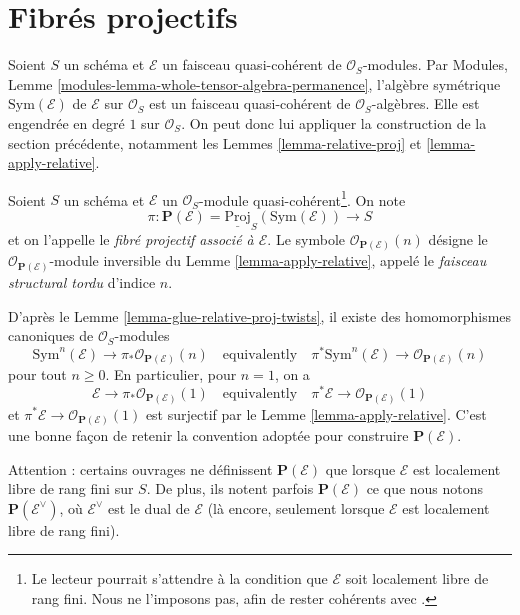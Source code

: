 \section{Fibrés projectifs}
\label{section-projective-bundle}

\noindent
Soient $S$ un schéma et $\mathcal{E}$ un faisceau quasi-cohérent de
$\mathcal{O}_S$-modules. Par Modules,
Lemme \ref{modules-lemma-whole-tensor-algebra-permanence}, l'algèbre
symétrique $\text{Sym}(\mathcal{E})$
de $\mathcal{E}$ sur $\mathcal{O}_S$
est un faisceau quasi-cohérent de $\mathcal{O}_S$-algèbres. Elle est
engendrée en degré $1$ sur $\mathcal{O}_S$.
On peut donc lui appliquer la
construction de la section précédente, notamment les Lemmes
\ref{lemma-relative-proj} et \ref{lemma-apply-relative}.

\begin{definition}
\label{definition-projective-bundle}
Soient $S$ un schéma et $\mathcal{E}$ un $\mathcal{O}_S$-module
quasi-cohérent\footnote{Le lecteur pourrait s'attendre à la condition que
$\mathcal{E}$ soit localement libre de rang fini. Nous ne l'imposons pas,
afin de rester cohérents avec \cite[II, définition 4.1.1]{EGA}.}.
On note
$$
\pi :
\mathbf{P}(\mathcal{E}) = \underline{\text{Proj}}_S(\text{Sym}(\mathcal{E}))
\longrightarrow
S
$$
et on l'appelle le {\it fibré projectif associé à $\mathcal{E}$}.
Le symbole $\mathcal{O}_{\mathbf{P}(\mathcal{E})}(n)$ désigne le
$\mathcal{O}_{\mathbf{P}(\mathcal{E})}$-module inversible du
Lemme \ref{lemma-apply-relative}, appelé
le {\it faisceau structural tordu}
d'indice $n$.
\end{definition}

\noindent
D'après le Lemme \ref{lemma-glue-relative-proj-twists}, il existe des
homomorphismes canoniques de $\mathcal{O}_S$-modules
$$
\text{Sym}^n(\mathcal{E})
\longrightarrow
\pi_*\mathcal{O}_{\mathbf{P}(\mathcal{E})}(n)
\quad\text{equivalently}\quad
\pi^*\text{Sym}^n(\mathcal{E})
\longrightarrow
\mathcal{O}_{\mathbf{P}(\mathcal{E})}(n)
$$
pour tout $n \geq 0$. En particulier, pour $n = 1$, on a
$$
\mathcal{E}
\longrightarrow
\pi_*\mathcal{O}_{\mathbf{P}(\mathcal{E})}(1)
\quad\text{equivalently}\quad
\pi^*\mathcal{E}
\longrightarrow
\mathcal{O}_{\mathbf{P}(\mathcal{E})}(1)
$$
et $\pi^*\mathcal{E} \to \mathcal{O}_{\mathbf{P}(\mathcal{E})}(1)$ est
surjectif par le Lemme \ref{lemma-apply-relative}. C'est une bonne façon
de retenir la convention adoptée pour
construire $\mathbf{P}(\mathcal{E})$.

\medskip\noindent
Attention : certains ouvrages ne définissent $\mathbf{P}(\mathcal{E})$
que lorsque $\mathcal{E}$ est localement libre de rang fini sur $S$.
De plus, ils notent parfois $\mathbf{P}(\mathcal{E})$ ce que nous notons
$\mathbf{P}(\mathcal{E}^\vee)$, où $\mathcal{E}^\vee$ est le dual de
$\mathcal{E}$ (là encore, seulement lorsque $\mathcal{E}$ est localement libre de rang
fini).

